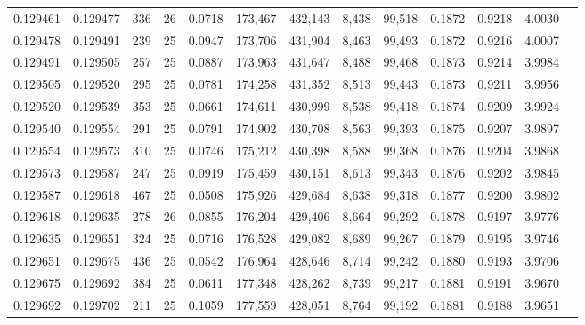 \begin{tabular}{rrrrrrrrrrrrr}
0.129461 & 0.129477 &   336 &  26 &                                     0.0718 & 173,467 & 432,143 &   8,438 &  99,518 & 0.1872 & 0.9218 & 4.0030 \\
0.129478 & 0.129491 &   239 &  25 &                                     0.0947 & 173,706 & 431,904 &   8,463 &  99,493 & 0.1872 & 0.9216 & 4.0007 \\
0.129491 & 0.129505 &   257 &  25 &                                     0.0887 & 173,963 & 431,647 &   8,488 &  99,468 & 0.1873 & 0.9214 & 3.9984 \\
0.129505 & 0.129520 &   295 &  25 &                                     0.0781 & 174,258 & 431,352 &   8,513 &  99,443 & 0.1873 & 0.9211 & 3.9956 \\
0.129520 & 0.129539 &   353 &  25 &                                     0.0661 & 174,611 & 430,999 &   8,538 &  99,418 & 0.1874 & 0.9209 & 3.9924 \\
0.129540 & 0.129554 &   291 &  25 &                                     0.0791 & 174,902 & 430,708 &   8,563 &  99,393 & 0.1875 & 0.9207 & 3.9897 \\
0.129554 & 0.129573 &   310 &  25 &                                     0.0746 & 175,212 & 430,398 &   8,588 &  99,368 & 0.1876 & 0.9204 & 3.9868 \\
0.129573 & 0.129587 &   247 &  25 &                                     0.0919 & 175,459 & 430,151 &   8,613 &  99,343 & 0.1876 & 0.9202 & 3.9845 \\
0.129587 & 0.129618 &   467 &  25 &                                     0.0508 & 175,926 & 429,684 &   8,638 &  99,318 & 0.1877 & 0.9200 & 3.9802 \\
0.129618 & 0.129635 &   278 &  26 &                                     0.0855 & 176,204 & 429,406 &   8,664 &  99,292 & 0.1878 & 0.9197 & 3.9776 \\
0.129635 & 0.129651 &   324 &  25 &                                     0.0716 & 176,528 & 429,082 &   8,689 &  99,267 & 0.1879 & 0.9195 & 3.9746 \\
0.129651 & 0.129675 &   436 &  25 &                                     0.0542 & 176,964 & 428,646 &   8,714 &  99,242 & 0.1880 & 0.9193 & 3.9706 \\
0.129675 & 0.129692 &   384 &  25 &                                     0.0611 & 177,348 & 428,262 &   8,739 &  99,217 & 0.1881 & 0.9191 & 3.9670 \\
0.129692 & 0.129702 &   211 &  25 &                                     0.1059 & 177,559 & 428,051 &   8,764 &  99,192 & 0.1881 & 0.9188 & 3.9651 \\

\end{tabular}
